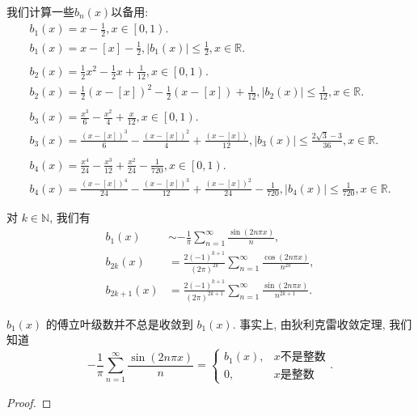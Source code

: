 \documentclass[../../main.tex]{subfiles}%
\begin{document}
\begin{conclusion}\label{conclusion:b_n(x)的初等表达式}
我们计算一些$b_n(x)$以备用:
\begin{gather*}
b_1\left( x \right) =x-\frac{1}{2},x\in \left[ 0,1 \right) .
\\
b_1\left( x \right) =x-\left[ x \right] -\frac{1}{2},\left| b_1\left( x \right) \right|\leqslant \frac{1}{2},x\in \mathbb{R} .
\\
\\
b_2\left( x \right) =\frac{1}{2}x^2-\frac{1}{2}x+\frac{1}{12},x\in \left[ 0,1 \right) .
\\
b_2\left( x \right) =\frac{1}{2}\left( x-\left[ x \right] \right) ^2-\frac{1}{2}\left( x-\left[ x \right] \right) +\frac{1}{12},\left| b_2\left( x \right) \right|\leqslant \frac{1}{12},x\in \mathbb{R} .
\\
\\
b_3\left( x \right) =\frac{x^3}{6}-\frac{x^2}{4}+\frac{x}{12},x\in \left[ 0,1 \right) .
\\
b_3\left( x \right) =\frac{\left( x-\left[ x \right] \right) ^3}{6}-\frac{\left( x-\left[ x \right] \right) ^2}{4}+\frac{\left( x-\left[ x \right] \right)}{12},\left| b_3\left( x \right) \right|\leqslant \frac{2\sqrt{3}-3}{36},x\in \mathbb{R} .
\\
\\
b_4\left( x \right) =\frac{x^4}{24}-\frac{x^3}{12}+\frac{x^2}{24}-\frac{1}{720},x\in \left[ 0,1 \right) .
\\
b_4\left( x \right) =\frac{\left( x-\left[ x \right] \right) ^4}{24}-\frac{\left( x-\left[ x \right] \right) ^3}{12}+\frac{\left( x-\left[ x \right] \right) ^2}{24}-\frac{1}{720},\left| b_4\left( x \right) \right|\leqslant \frac{1}{720},x\in \mathbb{R} .
\end{gather*}
\end{conclusion}

\begin{proposition}[$b_n(x)$ 的傅立叶级数表达式]
对 $k \in \mathbb{N}$, 我们有
\begin{align*}
b_1(x) &\sim -\frac{1}{\pi} \sum\limits_{n=1}^\infty \frac{\sin(2n\pi x)}{n}, \\
b_{2k}(x) &= \frac{2(-1)^{k+1}}{(2\pi)^{2k}} \sum\limits_{n=1}^\infty \frac{\cos(2n\pi x)}{n^{2k}}, \\
b_{2k+1}(x) &= \frac{2(-1)^{k+1}}{(2\pi)^{2k+1}} \sum\limits_{n=1}^\infty \frac{\sin(2n\pi x)}{n^{2k+1}}.
\end{align*}
\end{proposition}
\begin{remark}
$b_1(x)$ 的傅立叶级数并不总是收敛到 $b_1(x)$. 事实上, 由狄利克雷收敛定理, 我们知道
$$-\frac{1}{\pi} \sum\limits_{n=1}^\infty \frac{\sin(2n\pi x)}{n} = \begin{cases} 
b_1(x), & x \text{不是整数} \\
0, & x \text{是整数} 
\end{cases}.$$
\end{remark}
\begin{proof}

\end{proof}
\end{document}
